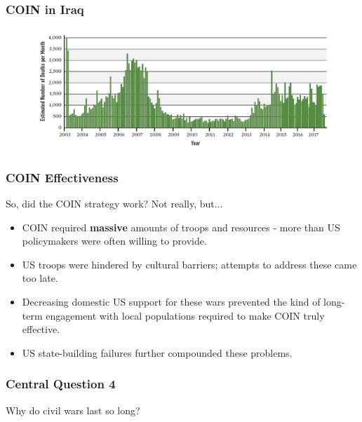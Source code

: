 \documentclass{beamer}
\begin{document}
\begin{frame} 
	\frametitle{\LARGE{COIN in Iraq}}
	\begin{figure}[ht!]
		\centering
		\includegraphics[width=\textwidth,height=\textheight,keepaspectratio]{./surge.png}
	\end{figure}
\end{frame}

\begin{frame} 
	\frametitle{\LARGE{COIN Effectiveness}}
So, did the COIN strategy work? Not really, but...
	\begin{itemize}
		\item COIN required \textbf{massive} amounts of troops and resources - more than US policymakers were often willing to provide. \pause
		\item US troops were hindered by cultural barriers; attempts to address these came too late. \pause
		\item Decreasing domestic US support for these wars prevented the kind of long-term engagement with local populations required to make COIN truly effective. \pause
		\item US state-building failures further compounded these problems.
	\end{itemize}
\end{frame}

\begin{frame} 
	\frametitle{\LARGE{Central Question 4}}
	\centering
	\Large{Why do civil wars last so long?} 
\end{frame}
\end{document}
